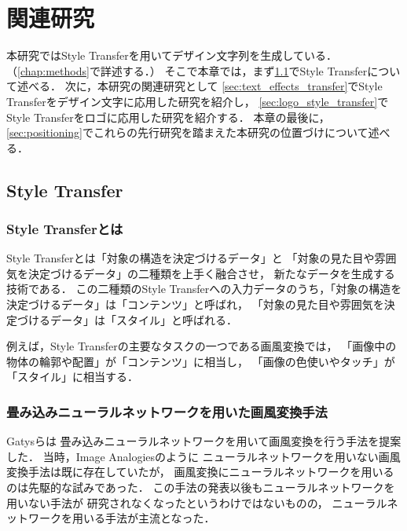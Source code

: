 \documentclass[\homedir/main.tex]{subfiles}
\begin{document}
\setcounter{chapter}{1}
\chapter{関連研究}\label{chap:related_works}
本研究ではStyle Transferを用いてデザイン文字列を生成している．（\cref{chap:methods}で詳述する．）
そこで本章では，まず\cref{sec:style_transfer}でStyle Transferについて述べる．
次に，本研究の関連研究として
\cref{sec:text_effects_transfer}でStyle Transferをデザイン文字に応用した研究を紹介し，
\cref{sec:logo_style_transfer}でStyle Transferをロゴに応用した研究を紹介する．
本章の最後に，\cref{sec:positioning}でこれらの先行研究を踏まえた本研究の位置づけについて述べる．

\section{Style Transfer}\label{sec:style_transfer}
\subsection{Style Transferとは}
Style Transferとは「対象の構造を決定づけるデータ」と
「対象の見た目や雰囲気を決定づけるデータ」の二種類を上手く融合させ，
新たなデータを生成する技術である．
この二種類のStyle Transferへの入力データのうち，「対象の構造を決定づけるデータ」は「コンテンツ」と呼ばれ，
「対象の見た目や雰囲気を決定づけるデータ」は「スタイル」と呼ばれる．

例えば，Style Transferの主要なタスクの一つである画風変換では，
「画像中の物体の輪郭や配置」が「コンテンツ」に相当し，
「画像の色使いやタッチ」が「スタイル」に相当する．

\subsection{畳み込みニューラルネットワークを用いた画風変換手法}
Gatysら\cite{Gatys_2016_CVPR}は
畳み込みニューラルネットワークを用いて画風変換を行う手法を提案した．
当時，Image Analogies\cite{Hertzmann_2001}のように
ニューラルネットワークを用いない画風変換手法は既に存在していたが，
画風変換にニューラルネットワークを用いるのは先駆的な試みであった．
この手法の発表以後もニューラルネットワークを用いない手法\cite{Elad_2017}が
研究されなくなったというわけではないものの，
ニューラルネットワークを用いる手法\cite{Johnson_2016, Li_2017}が主流となった．
\end{document}
